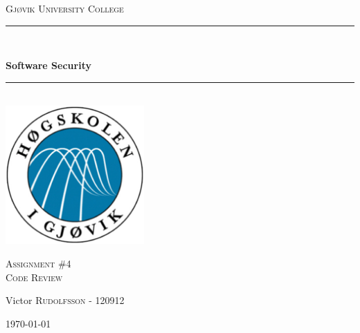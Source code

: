 \documentclass[12pt]{article} %
\begin{document}

\begin{titlepage}

\newcommand{\HRule}{\rule{\linewidth}{0.5mm}} %

\center %
\begin{myfont}
\textsc{{\large Gjøvik University College}}\\[0.5cm] %
\end{myfont}
\HRule \\[0.4cm]

\begin{myfont}
{ \huge \bfseries Software Security}\\[0cm] %
\end{myfont}

\HRule \\[0.4cm]
\includegraphics[width=200px, height=200px]{logo}\\[0.8cm] %
\begin{myfont}
\textsc{\Large Assignment \#4}\\[0.5cm] %
\textsc{\large Code Review}\\[0.5cm] %
\end{myfont}


\begin{minipage}{0.44\textwidth}
\begin{flushleft} \large
\begin{myfont}
Victor \textsc{Rudolfsson} - 120912\\ %
\end{myfont}
\end{flushleft}
\end{minipage}

\vfill %
{\large \today}\\[3cm] %

\end{titlepage}
\end{document}
